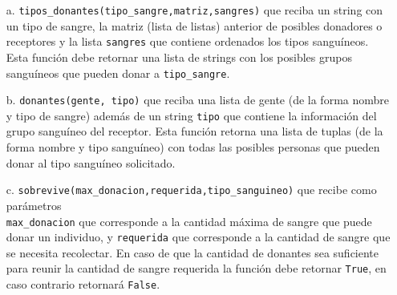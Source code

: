 \begin{itemize}
    \item[a.] \texttt{tipos\_donantes(tipo\_sangre,matriz,sangres)} que reciba un string con un  tipo de sangre, la matriz (lista de listas) anterior de posibles donadores o receptores y la lista \texttt{sangres} que contiene ordenados los tipos sanguíneos. Esta función debe retornar una lista de strings con los posibles grupos sanguíneos que pueden donar a \texttt{tipo\_sangre}.
    \item[b.] \texttt{donantes(gente, tipo)} que reciba una lista de gente (de la forma nombre y tipo de sangre) además de un string \texttt{tipo} que contiene la información del grupo sanguíneo del receptor. Esta función retorna una lista de tuplas (de la forma nombre y tipo sanguíneo) con todas las posibles personas que pueden donar al tipo sanguíneo solicitado.
    \item[c.] \texttt{sobrevive(max\_donacion,requerida,tipo\_sanguineo)} que recibe como parámetros \\ \texttt{max\_donacion} que corresponde a la cantidad máxima de sangre que puede donar un individuo, y \texttt{requerida} que corresponde a la cantidad de sangre que se necesita recolectar. En caso de que la cantidad de donantes sea suficiente para reunir la cantidad de sangre requerida la función debe retornar \texttt{True}, en caso contrario retornará \texttt{False}.
\end{itemize}
